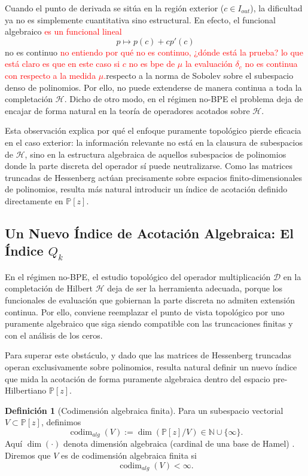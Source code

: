 \documentclass[12pt,a4paper]{article}
\theoremstyle{definition}
\newtheorem{definition}{Definición}
\theoremstyle{remark}
\begin{document}
Cuando el punto de derivada se sitúa en la región exterior ($c \in I_{out}$), la dificultad ya no es simplemente cuantitativa sino estructural. En efecto, el funcional algebraico \textcolor{red}{es un funcional lineal}
\[
	p \longmapsto p(c) + c p'(c)
\]
no es continuo  \textcolor{red}{no entiendo por qué no es continuo, ¿dónde está la prueba? lo que está claro es que en este caso si $c$ no es bpe de $\mu$ la evaluación $\delta_c$ no es continua con respecto a la medida $\mu$.}respecto a la norma de Sobolev sobre el subespacio denso de polinomios. Por ello, no puede extenderse de manera continua a toda la completación $\mathcal{H}$. Dicho de otro modo, en el régimen no-BPE el problema deja de encajar de forma natural en la teoría de operadores acotados sobre $\mathcal{H}$.

Esta observación explica por qué el enfoque puramente topológico pierde eficacia en el caso exterior: la información relevante no está en la clausura de subespacios de $\mathcal{H}$, sino en la estructura algebraica de aquellos subespacios de polinomios donde la parte discreta del operador sí puede neutralizarse. Como las matrices truncadas de Hessenberg actúan precisamente sobre espacios finito-dimensionales de polinomios, resulta más natural introducir un índice de acotación definido directamente en $\mathbb{P}[z]$.

\subsection{Un Nuevo Índice de Acotación Algebraica: El Índice $Q_k$}

En el régimen no-BPE, el estudio topológico del operador multiplicación $\mathcal{D}$ en la completación de Hilbert $\mathcal{H}$ deja de ser la herramienta adecuada, porque los funcionales de evaluación que gobiernan la parte discreta no admiten extensión continua. Por ello, conviene reemplazar el punto de vista topológico por uno puramente algebraico que siga siendo compatible con las truncaciones finitas y con el análisis de los ceros.

Para superar este obstáculo, y dado que las matrices de Hessenberg truncadas operan exclusivamente sobre polinomios, resulta natural definir un nuevo índice que mida la acotación de forma puramente algebraica dentro del espacio pre-Hilbertiano $\mathbb{P}[z]$.

\begin{definition}[Codimensión algebraica finita]\label{def:codim_alg}
	Para un subespacio vectorial $V\subset \mathbb P[z]$, definimos
	\[
		\operatorname{codim}_{alg}(V):=\dim(\mathbb P[z]/V)\in \mathbb N\cup\{\infty\}.
	\]
	Aquí $\dim(\cdot)$ denota dimensión algebraica (cardinal de una base de Hamel) \cite{hormander1989linearfunctionalanalysis,Aizpuru2009Apuntes}.
	Diremos que $V$ es de codimensión algebraica finita si
	\[
		\operatorname{codim}_{alg}(V)<\infty.
	\]
\end{definition}
\end{document}
